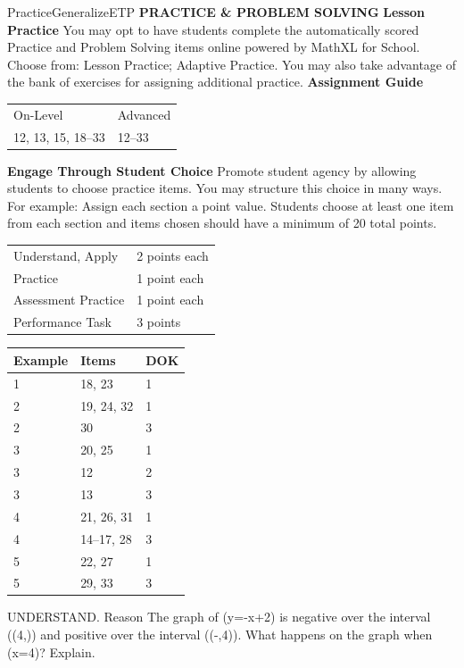 \documentclass{article}
\newenvironment{item-analysis}{}{}      %
\newenvironment{practice}[2]{}{}        %
\newenvironment{te-addendum}[2]{}{}     %
\newcommand{\answer}[1]{}               %
\newcommand{\te}[1]{}                   %
\begin{document}
\begin{te-addendum}{Practice}{GeneralizeETP}
\textbf{PRACTICE \& PROBLEM SOLVING}
\textbf{Lesson Practice} You may opt to have students complete the automatically scored Practice and Problem Solving items online powered by MathXL for School.
Choose from: Lesson Practice; Adaptive Practice.
You may also take advantage of the bank of exercises for assigning additional practice.
\textbf{Assignment Guide}
\begin{tabular}{ll}
On-Level & Advanced \\
12, 13, 15, 18--33 & 12--33 \\
\end{tabular}
\textbf{Engage Through Student Choice}
Promote student agency by allowing students to choose practice items. You may structure this choice in many ways.
For example:
Assign each section a point value. Students choose at least one item from each section and items chosen should have a minimum of 20 total points.
\begin{tabular}{ll}
Understand, Apply & 2 points each \\
Practice & 1 point each \\
Assessment Practice & 1 point each \\
Performance Task & 3 points \\
\end{tabular}
\te{Practice \& Problem Solving and video tutorials are available at SavvasRealize.com. Scan the QR code to access a video tutorial.}
\end{te-addendum}
\begin{item-analysis}
\begin{tabular}{lll}
\toprule
Example & Items & DOK \\
\midrule
1 & 18, 23 & 1 \\
2 & 19, 24, 32 & 1 \\
2 & 30 & 3 \\
3 & 20, 25 & 1 \\
3 & 12 & 2 \\
3 & 13 & 3 \\
4 & 21, 26, 31 & 1 \\
4 & 14--17, 28 & 3 \\
5 & 22, 27 & 1 \\
5 & 29, 33 & 3 \\
\bottomrule
\end{tabular}
\end{item-analysis}
\begin{practice}{12}{2}
UNDERSTAND. Reason The graph of (y=-x+2) is negative over the interval ((4,\infty)) and positive over the interval ((-\infty,4)). What happens on the graph when (x=4)? Explain.
\answer{There is a zero at (x=4) because the function is changing from negative to positive at (x=4).}
\te{Printed “changing from negative to positive”; likely “changing from positive to negative” as x increases, consistent with the printed equation and prompt.}
\end{practice}
\end{document}
